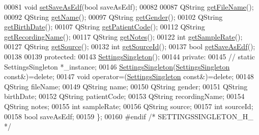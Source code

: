 \begin{DoxyCode}
00081     \textcolor{keywordtype}{void} \hyperlink{classSettingsSingleton_adb4221d2f742cff29038bfda74cfc784}{setSaveAsEdf}(\textcolor{keywordtype}{bool} saveAsEdf);
00082 
00087     QString \hyperlink{classSettingsSingleton_aa5c7ee7b9966f8391d7431a7e8ab3949}{getFileName}();
00092     QString \hyperlink{classSettingsSingleton_ab9e0ab27c53f748e458cfb14f71a94ea}{getName}();
00097     QString \hyperlink{classSettingsSingleton_a3e61e7730d97ab3e893499538aba04ba}{getGender}();
00102     QString \hyperlink{classSettingsSingleton_a8e25762548883f476860ed5e1ab0b366}{getBirthDate}();
00107     QString \hyperlink{classSettingsSingleton_a01b74f6d99cfbbd5bc6114b69ee5c87c}{getPatientCode}();
00112     QString \hyperlink{classSettingsSingleton_a0275cd8a138fa91222ad36d9fbf465d2}{getRecordingName}();
00117     QString \hyperlink{classSettingsSingleton_a14e8cddfa2bfbc896b9f31bddb4e675b}{getNotes}();
00122     \textcolor{keywordtype}{int} \hyperlink{classSettingsSingleton_a11896cc46cb374ae6a8234e1cd3cb68f}{getSampleRate}();
00127     QString \hyperlink{classSettingsSingleton_a612c925c64e9862b0fdeca1b5f8f4773}{getSource}();
00132     \textcolor{keywordtype}{int} \hyperlink{classSettingsSingleton_aa6db88481c421b96974519b8e28192c9}{getSourceId}();
00137     \textcolor{keywordtype}{bool} \hyperlink{classSettingsSingleton_ad40343fdaed55e07e0b98361792ab142}{getSaveAsEdf}();
00138 
00139 \textcolor{keyword}{protected}:
00143     \hyperlink{classSettingsSingleton_af3d8ea55c2c625c0b6504b472d8664af}{SettingsSingleton}();
00144 \textcolor{keyword}{private}:
00145  \textcolor{comment}{//   static SettingsSingleton *\_instance;}
00146     \hyperlink{classSettingsSingleton_af3d8ea55c2c625c0b6504b472d8664af}{SettingsSingleton}(\hyperlink{classSettingsSingleton}{SettingsSingleton} \textcolor{keyword}{const}&)=\textcolor{keyword}{delete};
00147     \textcolor{keywordtype}{void} operator=(\hyperlink{classSettingsSingleton}{SettingsSingleton} \textcolor{keyword}{const}&)=\textcolor{keyword}{delete};
00148     QString fileName;
00149     QString name;
00150     QString gender;
00151     QString birthDate;
00152     QString patientCode;
00153     QString recordingName;
00154     QString notes;
00155     \textcolor{keywordtype}{int} sampleRate;
00156     QString source;
00157     \textcolor{keywordtype}{int} sourceId;
00158     \textcolor{keywordtype}{bool} saveAsEdf;
00159 \};
00160 \textcolor{preprocessor}{#endif }\textcolor{comment}{/* SETTINGSSINGLETON\_H\_ */}\textcolor{preprocessor}{}
\end{DoxyCode}
